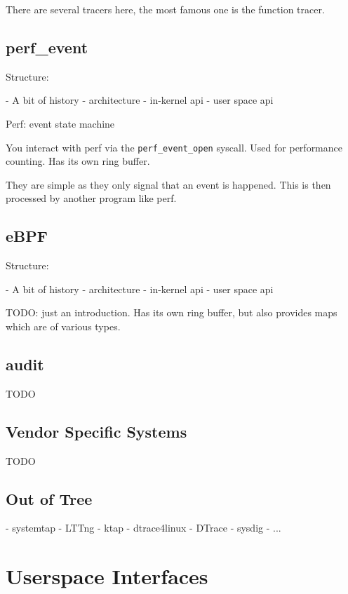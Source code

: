 There are several tracers here, the most famous one is the function
tracer.

\subsection{perf\_event}

Structure:

- A bit of history
- architecture
- in-kernel api
- user space api

Perf: event state machine

You interact with perf via the \verb|perf_event_open| syscall.
Used for performance counting. Has its own ring buffer.

They are simple as they only signal that an event is happened. This
is then processed by another program like perf.

\subsection{eBPF}

Structure:

- A bit of history
- architecture
- in-kernel api
- user space api

TODO: just an introduction.
Has its own ring buffer, but also provides maps which are of
various types.

\subsection{audit}

TODO

\subsection{Vendor Specific Systems}

TODO

\subsection{Out of Tree}

  - systemtap
  - LTTng
  - ktap
  - dtrace4linux
  - DTrace
  - sysdig
  - ...
  
\section{Userspace Interfaces}

